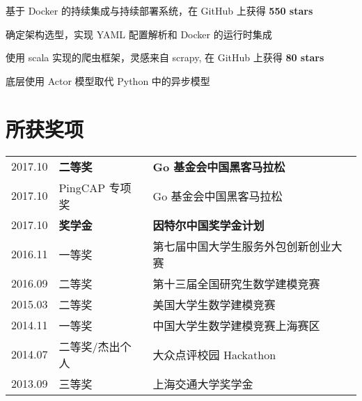 \documentclass[]{deedy-resume-openfont}
\begin{document}
\hfill
\begin{minipage}[t]{0.68\textwidth}



\begin{tightemize}
    \item 基于 Docker 的持续集成与持续部署系统，在 GitHub 上获得 \textbf{550 stars}
    \item 确定架构选型，实现 YAML 配置解析和 Docker 的运行时集成
    \end{tightemize}
\sectionsep

\begin{tightemize}
    \item 使用 scala 实现的爬虫框架，灵感来自 scrapy, 在 GitHub 上获得 \textbf{80 stars}
    \item 底层使用 Actor 模型取代 Python 中的异步模型
    \end{tightemize}
\sectionsep

\section{所获奖项}
\sectionsep
\begin{tabular}{rll}
2017.10     & \textbf{二等奖}  & \textbf{Go 基金会中国黑客马拉松} \\
2017.10     & PingCAP 专项奖 & Go 基金会中国黑客马拉松 \\
2017.10     & \textbf{奖学金}  & \textbf{因特尔中国奖学金计划} \\
2016.11	    & 一等奖  & 第七届中国大学生服务外包创新创业大赛 \\
2016.09	    & 二等奖  & 第十三届全国研究生数学建模竞赛 \\
2015.03	    & 二等奖  & 美国大学生数学建模竞赛 \\
2014.11     & 一等奖 & 中国大学生数学建模竞赛上海赛区 \\
2014.07	    & 二等奖/杰出个人  & 大众点评校园 Hackathon \\
2013.09     & 三等奖 & 上海交通大学奖学金 \\
\end{tabular}
\sectionsep


\end{minipage}
\end{document}
